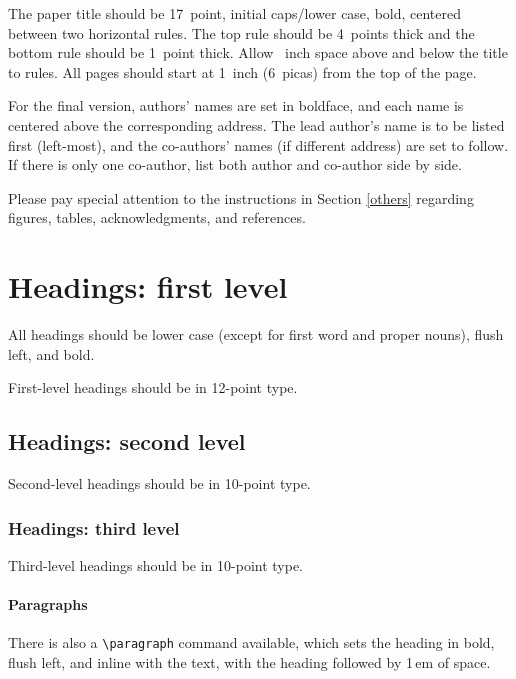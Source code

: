 \documentclass{article}
\begin{document}
The paper title should be 17~point, initial caps/lower case, bold, centered
between two horizontal rules. The top rule should be 4~points thick and the
bottom rule should be 1~point thick. Allow ~inch space above and
below the title to rules. All pages should start at 1~inch (6~picas) from the
top of the page.


For the final version, authors' names are set in boldface, and each name is
centered above the corresponding address. The lead author's name is to be listed
first (left-most), and the co-authors' names (if different address) are set to
follow. If there is only one co-author, list both author and co-author side by
side.


Please pay special attention to the instructions in Section \ref{others}
regarding figures, tables, acknowledgments, and references.


\section{Headings: first level}
\label{headings}


All headings should be lower case (except for first word and proper nouns),
flush left, and bold.


First-level headings should be in 12-point type.


\subsection{Headings: second level}


Second-level headings should be in 10-point type.


\subsubsection{Headings: third level}


Third-level headings should be in 10-point type.


\paragraph{Paragraphs}


There is also a \verb+\paragraph+ command available, which sets the heading in
bold, flush left, and inline with the text, with the heading followed by 1\,em
of space.
\end{document}
